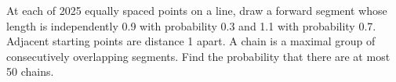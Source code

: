 At each of 2025 equally spaced points on a line, draw a forward segment whose length is independently 0.9 with probability 0.3 and 1.1 with probability 0.7. Adjacent starting points are distance 1 apart. A chain is a maximal group of consecutively overlapping segments. Find the probability that there are at most 50 chains.

